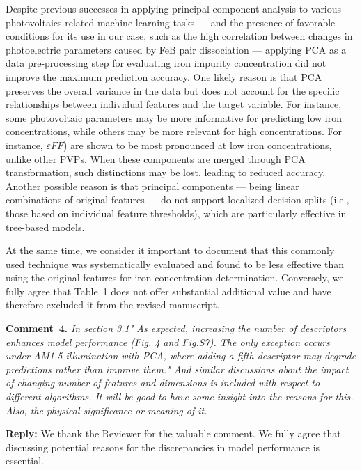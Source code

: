\documentclass[a4paper,fleqn]{cas-sc}
\begin{document}
Despite previous successes in applying principal component analysis to various photovoltaics-related machine learning tasks ---
and the presence of favorable conditions for its use in our case,
such as the high correlation between changes in photoelectric parameters caused by FeB pair dissociation ---
applying PCA as a data pre-processing step for evaluating iron impurity concentration did not improve the maximum prediction accuracy.
One likely reason is that PCA preserves the overall variance in the data
but does not account for the specific relationships between individual features and the target variable.
For instance, some photovoltaic parameters may be more informative for predicting low iron concentrations,
while others may be more relevant for high concentrations.
For instance, $\varepsilon F\!F$) are shown \cite{Olikh2025MSEB} to be most pronounced at low iron concentrations, unlike other PVPs.
When these components are merged through PCA transformation, such distinctions may be lost, leading to reduced accuracy.
Another possible reason is that principal components ---
being linear combinations of original features --- do not support localized decision splits
(i.e., those based on individual feature thresholds), which are particularly effective in tree-based models.

At the same time, we consider it important to document that this commonly used technique was systematically evaluated
and found to be less effective than using the original features for iron concentration determination.
Conversely, we fully agree that Table~1 does not offer substantial additional value and have therefore excluded it from the revised manuscript.




\vspace{1cm}
\noindent
\textcolor[rgb]{0.00,0.50,1.00}{\textbf{Comment~4.}}
\emph{In section 3.1" As expected, increasing the number of descriptors enhances model performance (Fig. 4 and Fig.S7).
The only exception occurs under AM1.5 illumination with PCA, where adding a fifth descriptor may degrade predictions rather than improve them."
And similar discussions about the impact of changing number of features and dimensions is included with respect to different algorithms.
It will be good to have some insight into the reasons for this. Also, the physical significance or meaning of it.}

\noindent
\textcolor[rgb]{0.51,0.00,0.00}{\textbf{Reply:}}
We thank the Reviewer for the valuable comment.
We fully agree that discussing potential reasons for the discrepancies in model performance is essential.
\end{document}
